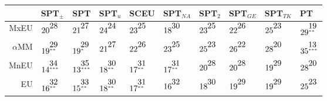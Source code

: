 \documentclass[a4paper]{article}\usepackage[]{graphicx}\usepackage[]{color}
\begin{document}
\begin{table}[!htb]
\centering
\begin{tabular}{rlllllllll}
  \hline
 & SPT$_{\pm}$ & SPT & SPT$_{u}$ & SCEU & SPT$_{NA}$ & SPT$_{2}$ & SPT$_{GE}$ & SPT$_{TK}$ & PT \\ 
  \hline
MxEU & $20^{\stackrel{\textstyle28\hfill}{\scriptscriptstyle\hfill}}$ & $21^{\stackrel{\textstyle27\hfill}{\scriptscriptstyle\hfill}}$ & $24^{\stackrel{\textstyle24\hfill}{\scriptscriptstyle\hfill}}$ & $23^{\stackrel{\textstyle25\hfill}{\scriptscriptstyle\hfill}}$ & $18^{\stackrel{\textstyle30\hfill}{\scriptscriptstyle\hfill}}$ & $23^{\stackrel{\textstyle25\hfill}{\scriptscriptstyle\hfill}}$ & $22^{\stackrel{\textstyle26\hfill}{\scriptscriptstyle\hfill}}$ & $25^{\stackrel{\textstyle23\hfill}{\scriptscriptstyle\hfill}}$ & $29^{\stackrel{\textstyle19\hfill}{\scriptscriptstyle**\hfill}}$ \\ 
  $\alpha$MM & $19^{\stackrel{\textstyle29\hfill}{\scriptscriptstyle**\hfill}}$ & $19^{\stackrel{\textstyle29\hfill}{\scriptscriptstyle*\hfill}}$ & $21^{\stackrel{\textstyle27\hfill}{\scriptscriptstyle\hfill}}$ & $22^{\stackrel{\textstyle26\hfill}{\scriptscriptstyle\hfill}}$ & $23^{\stackrel{\textstyle25\hfill}{\scriptscriptstyle\hfill}}$ & $25^{\stackrel{\textstyle23\hfill}{\scriptscriptstyle\hfill}}$ & $26^{\stackrel{\textstyle22\hfill}{\scriptscriptstyle\hfill}}$ & $28^{\stackrel{\textstyle20\hfill}{\scriptscriptstyle\hfill}}$ & $35^{\stackrel{\textstyle13\hfill}{\scriptscriptstyle***\hfill}}$ \\ 
  MnEU & $14^{\stackrel{\textstyle34\hfill}{\scriptscriptstyle***\hfill}}$ & $13^{\stackrel{\textstyle35\hfill}{\scriptscriptstyle***\hfill}}$ & $18^{\stackrel{\textstyle30\hfill}{\scriptscriptstyle**\hfill}}$ & $17^{\stackrel{\textstyle31\hfill}{\scriptscriptstyle**\hfill}}$ & $17^{\stackrel{\textstyle31\hfill}{\scriptscriptstyle**\hfill}}$ & $20^{\stackrel{\textstyle28\hfill}{\scriptscriptstyle\hfill}}$ & $20^{\stackrel{\textstyle28\hfill}{\scriptscriptstyle\hfill}}$ & $19^{\stackrel{\textstyle29\hfill}{\scriptscriptstyle\hfill}}$ & $28^{\stackrel{\textstyle20\hfill}{\scriptscriptstyle\hfill}}$ \\ 
  EU & $16^{\stackrel{\textstyle32\hfill}{\scriptscriptstyle**\hfill}}$ & $15^{\stackrel{\textstyle33\hfill}{\scriptscriptstyle**\hfill}}$ & $18^{\stackrel{\textstyle30\hfill}{\scriptscriptstyle**\hfill}}$ & $17^{\stackrel{\textstyle31\hfill}{\scriptscriptstyle**\hfill}}$ & $16^{\stackrel{\textstyle32\hfill}{\scriptscriptstyle\hfill}}$ & $18^{\stackrel{\textstyle30\hfill}{\scriptscriptstyle\hfill}}$ & $19^{\stackrel{\textstyle29\hfill}{\scriptscriptstyle\hfill}}$ & $19^{\stackrel{\textstyle29\hfill}{\scriptscriptstyle\hfill}}$ & $25^{\stackrel{\textstyle23\hfill}{\scriptscriptstyle\hfill}}$ \\ 

\end{tabular}
\end{table}
\end{document}
